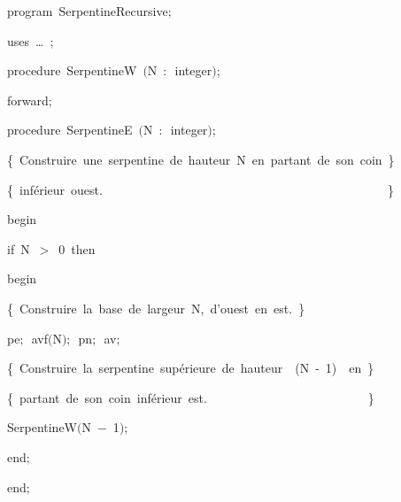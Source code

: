 
{
\parindent {}
\medskip

\carrenoir
\vspace{\neglskip}\mbox{\blc  \idt  \mcl program\idt \ SerpentineRecursive$;$
}\par 
\vspace{\neglskip}\mbox{\blc \blk\idt \mcl uses\idt \ \ldots\ $;$
}\par 
\medskip

\pagebreak[3] 
\vspace{\neglskip}\mbox{\blc  \blk\idt  \mcl procedure\idt \ SerpentineW\ $($N\ $:$\ integer$)$$;$}\par 
\vspace{\neglskip}\mbox{\blc  \blk\idt  forward$;$}\par 
\medskip

\pagebreak[3] 
\vspace{\neglskip}\mbox{\blc  \blk\idt  \mcl procedure\idt \ SerpentineE\ $($N\ $:$\ integer$)$$;$}\par 
\vspace{\neglskip}\mbox{\blc  \blk\blk\idt  \cmt  \{\ Construire\ une\ serpentine\ de\ hauteur\ N\ en\ partant\ de\ son\ coin\ \}\idt }\par 
\vspace{\neglskip}\mbox{\blc  \blk\blk\idt  \cmt  \{\ inférieur\ ouest.\ \ \ \ \ \ \ \ \ \ \ \ \ \ \ \ \ \ \ \ \ \ \ \ \ \ \ \ \ \ \ \ \ \ \ \ \ \ \ \ \ \ \ \ \ \ \}\idt }\par 
\vspace{\neglskip}\mbox{\blc  \blk\idt  \mcl begin\idt }\par 
\pagebreak[3] 
\vspace{\neglskip}\mbox{\blc  \blk\blk\idt  \mcl if\idt \ N\ $>$\ 0\ \mcl then\idt }\par 
\vspace{\neglskip}\mbox{\blc  \blk\blk\blk\idt  \mcl begin\idt }\par 
\vspace{\neglskip}\mbox{\blc  \blk\blk\blk\blk\idt  \cmt  \{\ Construire\ la\ base\ de\ largeur\ N,\ d{'}ouest\ en\ est.\ \}\idt }\par 
\vspace{\neglskip}\mbox{\blc  \blk\blk\blk\blk\idt  pe$;$\ avf$($N$)$$;$\ pn$;$\ av$;$}\par 
\vspace{\neglskip}\mbox{\blc  \blk\blk\blk\blk\idt  \cmt  \{\ Construire\ la\ serpentine\ supérieure\ de\ hauteur\ \ (N\ -\ 1)\ \ en\ \}\idt }\par 
\vspace{\neglskip}\mbox{\blc  \blk\blk\blk\blk\idt  \cmt  \{\ partant\ de\ son\ coin\ inférieur\ est.\ \ \ \ \ \ \ \ \ \ \ \ \ \ \ \ \ \ \ \ \ \ \ \ \ \ \}\idt }\par 
\vspace{\neglskip}\mbox{\blc  \blk\blk\blk\blk\idt  SerpentineW$($N\ $-$\ 1$)$$;$}\par 
\vspace{\neglskip}\mbox{\blc  \blk\blk\blk\idt  \mcl end\idt $;$}\par 
\vspace{\neglskip}\mbox{\blc  \blk\idt  \mcl end\idt $;$}\par 
\medskip

}
